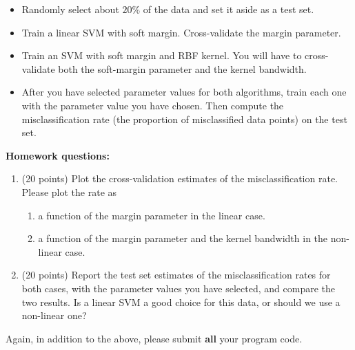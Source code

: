 \documentclass[]{../util/ColumbiaAssm}
\begin{document}
\begin{questions}
\begin{itemize}
\item Randomly select about $20\%$ of the data and set it aside as a test set.
\item Train a linear SVM with soft margin. Cross-validate the margin parameter.
\item Train an SVM with soft margin and RBF kernel. You will have to cross-validate both the soft-margin parameter and the kernel bandwidth.
\item After you have selected parameter values for both algorithms, train each one with the parameter value you have chosen. Then
  compute the misclassification rate (the proportion of misclassified data points) on the test set.
\end{itemize}
\textbf{Homework questions:}
\begin{enumerate}
\item (20 points) Plot the cross-validation estimates of the misclassification
rate. Please plot the rate as
  \begin{enumerate}
  \item a function of the margin parameter in the linear case.
  \item a function of the margin parameter and the kernel bandwidth in the non-linear case.
  \end{enumerate}
\item (20 points) Report the test set estimates of the misclassification rates for both cases, with the parameter values you have selected, and
  compare the two results. Is a linear SVM a good choice for this data, or should we use a non-linear one?
\end{enumerate}

Again, in addition to the above, please submit \textbf{all} your program code.



\end{questions}
\end{document}
